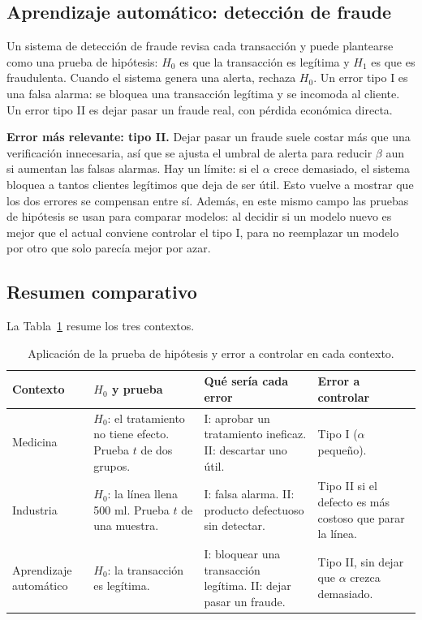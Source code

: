\documentclass[11pt,letterpaper]{article}
\begin{document}
\subsection{Aprendizaje automático: detección de fraude}

Un sistema de detección de fraude revisa cada transacción y puede plantearse como una prueba de hipótesis: $H_0$ es que la transacción es legítima y $H_1$ es que es fraudulenta. Cuando el sistema genera una alerta, rechaza $H_0$. Un error tipo I es una falsa alarma: se bloquea una transacción legítima y se incomoda al cliente. Un error tipo II es dejar pasar un fraude real, con pérdida económica directa.

\textbf{Error más relevante: tipo II.} Dejar pasar un fraude suele costar más que una verificación innecesaria, así que se ajusta el umbral de alerta para reducir $\beta$ aun si aumentan las falsas alarmas. Hay un límite: si el $\alpha$ crece demasiado, el sistema bloquea a tantos clientes legítimos que deja de ser útil. Esto vuelve a mostrar que los dos errores se compensan entre sí. Además, en este mismo campo las pruebas de hipótesis se usan para comparar modelos: al decidir si un modelo nuevo es mejor que el actual conviene controlar el tipo I, para no reemplazar un modelo por otro que solo parecía mejor por azar.

\subsection{Resumen comparativo}

La Tabla~\ref{tab:contextos} resume los tres contextos.

\begin{table}[htbp]
\centering
\caption{Aplicación de la prueba de hipótesis y error a controlar en cada contexto.}
\label{tab:contextos}
\small
\renewcommand{\arraystretch}{1.4}
\begin{tabular}{p{2.2cm}p{4.3cm}p{4.3cm}p{3.5cm}}
\hline
\textbf{Contexto} & \textbf{$H_0$ y prueba} & \textbf{Qué sería cada error} & \textbf{Error a controlar} \\
\hline
Medicina & $H_0$: el tratamiento no tiene efecto. Prueba $t$ de dos grupos. & I: aprobar un tratamiento ineficaz. II: descartar uno útil. & Tipo I ($\alpha$ pequeño). \\
Industria & $H_0$: la línea llena 500 ml. Prueba $t$ de una muestra. & I: falsa alarma. II: producto defectuoso sin detectar. & Tipo II si el defecto es más costoso que parar la línea. \\
Aprendizaje automático & $H_0$: la transacción es legítima. & I: bloquear una transacción legítima. II: dejar pasar un fraude. & Tipo II, sin dejar que $\alpha$ crezca demasiado. \\
\hline
\end{tabular}
\end{table}
\end{document}

